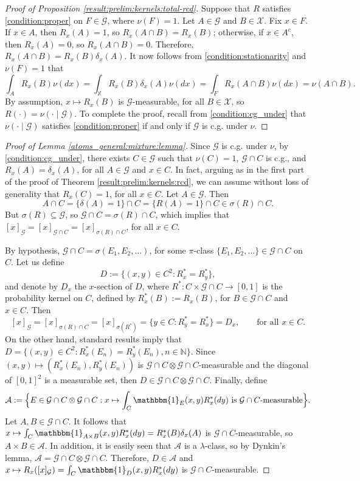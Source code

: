 \documentclass[a4paper]{article}
\theoremstyle{plain}
\theoremstyle{remark}
\theoremstyle{definition}
\begin{document}
\begin{proof}[Proof of Proposition \ref{result:prelim:kernels:total-rcd}]
Suppose that $R$ satisfies \eqref{condition:proper} on $F\in\mathcal{G}$, where $\nu(F)=1$. Let $A\in\mathcal{G}$ and $B\in\mathcal{X}$. Fix $x\in F$. If $x\in A$, then $R_x(A)=1$, so $R_x(A\cap B)=R_x(B)$; otherwise, if $x\in A^c$, then $R_x(A)=0$, so $R_x(A\cap B)=0$. Therefore, $R_x(A\cap B)=R_x(B)\delta_x(A)$. It now follows from \eqref{condition:stationarity} and $\nu(F)=1$ that
\[\int_AR_x(B)\nu(dx)=\int_\mathbb{X}R_x(B)\delta_x(A)\nu(dx)=\int_FR_x(A\cap B)\nu(dx)=\nu(A\cap B).\]
By assumption, $x\mapsto R_x(B)$ is $\mathcal{G}$-measurable, for all $B\in\mathcal{X}$, so $R(\cdot)=\nu(\cdot\mid\mathcal{G})$. To complete the proof, recall from \eqref{condition:cg_under} that $\nu(\cdot\mid\mathcal{G})$ satisfies \eqref{condition:proper} if and only if $\mathcal{G}$ is c.g. under $\nu$.
\end{proof}

\begin{proof}[Proof of Lemma \ref{atoms_general:mixture:lemma}]
Since $\mathcal{G}$ is c.g. under $\nu$, by \eqref{condition:cg_under}, there exists $C\in\mathcal{G}$ such that $\nu(C)=1$, $\mathcal{G}\cap C$ is c.g., and $R_x(A)=\delta_x(A)$, for all $A\in\mathcal{G}$ and $x\in C$. In fact, arguing as in the first part of the proof of Theorem \ref{result:prelim:kernels:rcd}, we can assume without loss of generality that $R_x(C)=1$, for all $x\in C$. Let $A\in\mathcal{G}$. Then
\[A\cap C=\{\delta(A)=1\}\cap C=\{R(A)=1\}\cap C\in\sigma(R)\cap C.\]
But $\sigma(R)\subseteq\mathcal{G}$, so $\mathcal{G}\cap C=\sigma(R)\cap C$, which implies that $[x]_{\mathcal{G}}=[x]_{\mathcal{G}\cap C}=[x]_{\sigma(R)\cap C}$, for all $x\in C$.

By hypothesis, $\mathcal{G}\cap C=\sigma(E_1,E_2,\ldots)$, for some $\pi$-class $\{E_1,E_2,\ldots\}\in\mathcal{G}\cap C$ on $C$. Let us define
\[D:=\bigl\{(x,y)\in C^2:R_x^*=R_y^*\bigr\},\]
and denote by $D_x$ the $x$-section of $D$, where $R^*:C\times\mathcal{G}\cap C\rightarrow[0,1]$ is the probability kernel on $C$, defined by $R_x^*(B):=R_x(B)$, for $B\in\mathcal{G}\cap C$ and $x\in C$. Then
\[[x]_\mathcal{G}=[x]_{\sigma(R)\cap C}=[x]_{\sigma(R^*)}=\{y\in C:R_y^*=R_x^*\}=D_x,\qquad\mbox{for all }x\in C.\]
On the other hand, standard results imply that $D=\{(x,y)\in C^2:R_x^*(E_n)=R_y^*(E_n),n\in\mathbb{N}\}$. Since $(x,y)\mapsto(R_x^*(E_n),R_y^*(E_n))$ is $\mathcal{G}\cap C\otimes\mathcal{G}\cap C$-measurable and the diagonal of $[0,1]^2$ is a measurable set, then $D\in\mathcal{G}\cap C\otimes\mathcal{G}\cap C$. Finally, define
\[\mathcal{A}:=\Bigl\{E\in\mathcal{G}\cap C\otimes\mathcal{G}\cap C:x\mapsto\int_C\mathbbm{1}_E(x,y)R_x^*(dy)\mbox{ is }\mathcal{G}\cap C\mbox{-measurable}\Bigr\}.\]
Let $A,B\in\mathcal{G}\cap C$. It follows that $x\mapsto\int_C\mathbbm{1}_{A\times B}(x,y)R_x^*(dy)=R_x^*(B)\delta_x(A)$ is $\mathcal{G}\cap C$-measurable, so $A\times B\in\mathcal{A}$. In addition, it is easily seen that $\mathcal{A}$ is a $\lambda$-class, so by Dynkin's lemma, $\mathcal{A}=\mathcal{G}\cap C\otimes\mathcal{G}\cap C$. Therefore, $D\in\mathcal{A}$ and $x\mapsto R_x([x]_\mathcal{G})=\int_C\mathbbm{1}_D(x,y)R_x^*(dy)$ is $\mathcal{G}\cap C$-measurable.
\end{proof}
\end{document}
